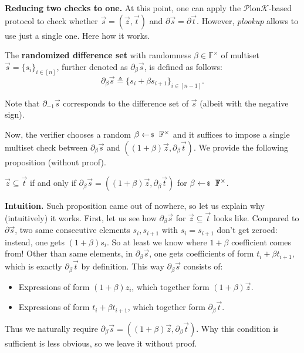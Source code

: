\textbf{Reducing two checks to one.} At this point, one can apply the
$\mathcal{P}$lon$\mathcal{K}$-based protocol to check whether $\vec{s} =
(\vec{z}, \vec{t})$ and $\partial\vec{s} = \partial\vec{t}$. However,
\textit{plookup} allows to use just a single one. Here how it works.

\begin{definition}
    The \textbf{randomized difference set} with randomness $\beta \in
    \mathbb{F}^{\times}$ of multiset $\vec{s}=\{s_i\}_{i \in [n]}$, further
    denoted as $\partial_{\beta}\vec{s}$, is defined as follows:
    \begin{equation*}
        \partial_{\beta}\vec{s} \triangleq \{s_i+\beta s_{i+1}\}_{i \in [n-1]}.
    \end{equation*}
\end{definition}

\begin{remark}
    Note that $\partial_{-1}\vec{s}$ corresponds to the difference set
    of $\vec{s}$ (albeit with the negative sign).
\end{remark}

Now, the verifier chooses a random $\beta \leftarrowS \mathbb{F}^{\times}$ and
it suffices to impose a single multiset check between $\partial_{\beta}\vec{s}$
and $((1+\beta)\vec{z},\partial_{\beta}\vec{t})$. We provide the following
proposition (without proof).
\begin{proposition}
    $\vec{z} \subseteq \vec{t}$ if and only if $\partial_{\beta}\vec{s} =
    ((1+\beta)\vec{z},\partial_{\beta}\vec{t})$ for $\beta \leftarrowS
    \mathbb{F}^{\times}$.
\end{proposition}

\textbf{Intuition.} Such proposition came out of nowhere, so let us explain why
(intuitively) it works. First, let us see how $\partial_{\beta}\vec{s}$ for
$\vec{z} \subseteq \vec{t}$ looks like. Compared to $\partial\vec{s}$, two same
consecutive elements $s_i,s_{i+1}$ with $s_i=s_{i+1}$ don't get zeroed: instead,
one gets $(1+\beta)s_i$. So at least we know where $1+\beta$ coefficient comes
from! Other than same elements, in $\partial_{\beta}\vec{s}$, one gets
coefficients of form $t_i+\beta t_{i+1}$, which is exactly
$\partial_{\beta}\vec{t}$ by definition. This way $\partial_{\beta}\vec{s}$ consists of:
\begin{itemize}
    \item Expressions of form $(1+\beta)z_i$, which together form $(1+\beta)\vec{z}$.
    \item Expressions of form $t_i+\beta t_{i+1}$, which together form
    $\partial_{\beta}\vec{t}$.
\end{itemize}
Thus we naturally require $\partial_{\beta}\vec{s} =
((1+\beta)\vec{z},\partial_{\beta}\vec{t})$. Why this condition is sufficient is
less obvious, so we leave it without proof.

